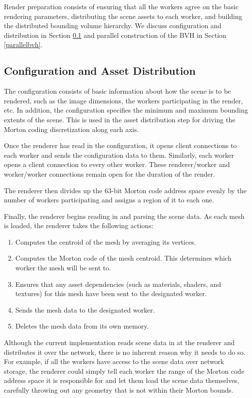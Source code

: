 \documentclass[12pt]{ucthesis}
\begin{document}
Render preparation consists of ensuring that all the workers agree on the
basic rendering parameters, distributing the scene assets to each worker, and
building the distributed bounding volume hierarchy. We discuss configuration
and distribution in Section \ref{sync} and parallel construction of the BVH in
Section \ref{parallelbvh}.

\subsection{Configuration and Asset Distribution}
\label{sync}

The configuration consists of basic information about how the scene is to be
rendered, such as the image dimensions, the workers participating in the render,
etc. In addition, the configuration specifies the minimum and maximum bounding
extents of the scene. This is used in the asset distribution step for driving
the Morton coding discretization along each axis.

Once the renderer has read in the configuration, it opens client connections
to each worker and sends the configuration data to them. Similarly, each worker
opens a client connection to every other worker. These renderer/worker and
worker/worker connections remain open for the duration of the render.

The renderer then divides up the 63-bit Morton code address space evenly by the
number of workers participating and assigns a region of it to each one.

Finally, the renderer begins reading in and parsing the scene data. As each mesh
is loaded, the renderer takes the following actions:

\begin{enumerate}
   \item Computes the centroid of the mesh by averaging its vertices.
   \item Computes the Morton code of the mesh centroid. This determines
      which worker the mesh will be sent to.
   \item Ensures that any asset dependencies (such as materials,
      shaders, and textures) for this mesh have been sent to the designated worker.
   \item Sends the mesh data to the designated worker.
   \item Deletes the mesh data from its own memory.
\end{enumerate}

Although the current implementation reads scene data in at the renderer
and distributes it over the network, there is no inherent reason why it needs to
do so. For example, if all the workers have access to the scene data over network
storage, the renderer could simply tell each worker the range of the Morton code
address space it is responsible for and let them load the scene data themselves,
carefully throwing out any geometry that is not within their Morton bounds.
\end{document}
